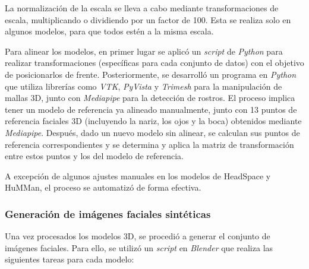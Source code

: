 La normalización de la escala se lleva a cabo mediante transformaciones de escala, multiplicando o dividiendo por un factor de 100. Esta se realiza solo en algunos modelos, para que todos estén a la misma escala.

Para alinear los modelos, en primer lugar se aplicó un \textit{script} de \textit{Python} para realizar transformaciones (específicas para cada conjunto de datos) con el objetivo de posicionarlos de frente. Posteriormente, se desarrolló un programa en \textit{Python} que utiliza librerías como \textit{VTK}, \textit{PyVista} y \textit{Trimesh} para la manipulación de mallas 3D, junto con \textit{Mediapipe} para la detección de rostros. El proceso implica tener un modelo de referencia ya alineado manualmente, junto con 13 puntos de referencia faciales 3D (incluyendo la nariz, los ojos y la boca) obtenidos mediante \textit{Mediapipe}. Después, dado un nuevo modelo sin alinear, se calculan sus puntos de referencia correspondientes y se determina y aplica la matriz de transformación entre estos puntos y los del modelo de referencia.

A excepción de algunos ajustes manuales en los modelos de HeadSpace y HuMMan, el proceso se automatizó de forma efectiva.

\subsubsection{Generación de imágenes faciales sintéticas}

Una vez procesados los modelos 3D, se procedió a generar el conjunto de imágenes faciales. Para ello, se utilizó un \textit{script} en \textit{Blender} que realiza las siguientes tareas para cada modelo:

\renewcommand{\theenumii}{\arabic{enumii}}

